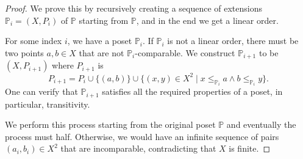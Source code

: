 \begin{proof}
    We prove this by recursively creating a sequence of extensions $\mathbb{P}_i = (X,P_i)$ of $\mathbb{P}$ starting from $\mathbb{P}$, and in the end we get a linear order.

    For some index $i$, we have a poset $\mathbb{P}_i$. If $\mathbb{P}_i$ is not a linear order, there must be two points $a,b \in X$ that are not $\mathbb{P}_i$-comparable. We construct $\mathbb{P}_{i+1}$ to be $(X,P_{i+1})$ where $P_{i+1}$ is
    $$
    P_{i+1} = P_i \cup \{ (a,b) \} \cup \{ (x,y) \in X^2 \mid x \leq_{\mathbb{P}_i} a \land b \leq_{\mathbb{P}_i} y \}.
    $$
    One can verify that $\mathbb{P}_{i+1}$ satisfies all the required properties of a poset, in particular, transitivity.

    We perform this process starting from the original poset $\mathbb{P}$ and eventually the process must half. Otherwise, we would have an infinite sequence of pairs $(a_i,b_i) \in X^2$ that are incomparable, contradicting that $X$ is finite.
\end{proof}